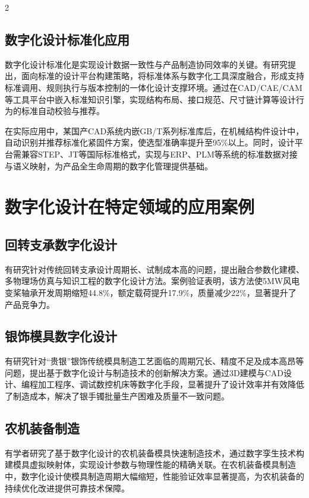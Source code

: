 \documentclass[fontset=windows,12pt,UTF8]{ctexart}
\begin{document}
\begin{multicols}{2}
	\subsection{数字化设计标准化应用}

	数字化设计标准化是实现设计数据一致性与产品制造协同效率的关键。有研究提出，面向标准的设计平台构建策略，将标准体系与数字化工具深度融合，形成支持标准调用、规则执行与版本控制的一体化设计支撑环境\cite{__2025-5}。通过在CAD/CAE/CAM等工具平台中嵌入标准知识引擎，实现结构布局、接口规范、尺寸链计算等设计行为的标准自动校验与推荐。

	在实际应用中，某国产CAD系统内嵌GB/T系列标准库后，在机械结构件设计中，自动识别并推荐标准化紧固件方案，使选型准确率提升至95\%以上。同时，设计平台需兼容STEP、JT等国际标准格式，实现与ERP、PLM等系统的标准数据对接与语义映射，为产品全生命周期的数字化管理提供基础。

	\section{数字化设计在特定领域的应用案例}

	\subsection{回转支承数字化设计}

	有研究针对传统回转支承设计周期长、试制成本高的问题，提出融合参数化建模、多物理场仿真与知识工程的数字化设计方法\cite{__2025-8}。案例验证表明，该方法使5MW风电变桨轴承开发周期缩短44.8\%，额定载荷提升17.9\%，质量减少22\%，显著提升了产品竞争力。

	\subsection{银饰模具数字化设计}

	有研究针对“贵银”银饰传统模具制造工艺面临的周期冗长、精度不足及成本高昂等问题，提出基于数字化设计与制造技术的创新解决方案\cite{__2025-4}。通过3D建模与CAD设计、编程加工程序、调试数控机床等数字化手段，显著提升了设计效率并有效降低了制造成本，解决了银手镯批量生产困难及质量不一致问题。

	\subsection{农机装备制造}

	有学者研究了基于数字化设计的农机装备模具快速制造技术，通过数字孪生技术构建模具虚拟映射体，实现设计参数与物理性能的精确关联\cite{__2025-3}。在农机装备模具制造中，数字化设计使模具制造周期大幅缩短，性能验证效率显著提高，为农机装备的持续优化改进提供可靠技术保障。


\end{multicols}
\end{document}
